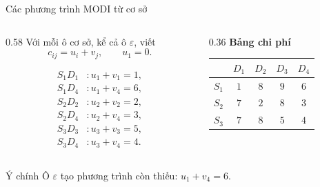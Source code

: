 \documentclass[10pt]{beamer}
\begin{document}
\begin{frame}{Các phương trình MODI từ cơ sở}
    \begin{columns}[c]
        \begin{column}{0.58\textwidth}
            Với mỗi ô cơ sở, kể cả ô $\varepsilon$, viết
            \[
                c_{ij}=u_i+v_j,
                \qquad u_1=0.
            \]

            \vspace{-0.15cm}
            \[
            \begin{aligned}
                S_1D_1 &: u_1+v_1=1,\\
                S_1D_4 &: u_1+v_4=6,\\
                S_2D_2 &: u_2+v_2=2,\\
                S_2D_4 &: u_2+v_4=3,\\
                S_3D_3 &: u_3+v_3=5,\\
                S_3D_4 &: u_3+v_4=4.
            \end{aligned}
            \]
        \end{column}
        \begin{column}{0.36\textwidth}
            \centering
            \scriptsize
            \textbf{Bảng chi phí}\\[0.08cm]
            \renewcommand{\arraystretch}{1.2}
            \begin{tabular}{c|cccc}
                & $D_1$ & $D_2$ & $D_3$ & $D_4$\\
                \hline
                $S_1$ & \cellcolor{occupied}$1$ & $8$ & $9$ & \cellcolor{epsiloncell}$6$\\
                $S_2$ & $7$ & \cellcolor{occupied}$2$ & $8$ & \cellcolor{occupied}$3$\\
                $S_3$ & $7$ & $8$ & \cellcolor{occupied}$5$ & \cellcolor{occupied}$4$
            \end{tabular}
        \end{column}
    \end{columns}

    \vspace{0.05cm}
    \begin{block}{Ý chính}
        Ô $\varepsilon$ tạo phương trình còn thiếu: $u_1+v_4=6$.
    \end{block}
\end{frame}
\end{document}
